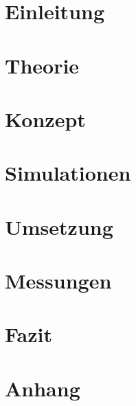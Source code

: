 \documentclass[11pt,a4paper,hidelinks]{article}
\begin{document}










\section{Einleitung}

\pagebreak

\section{Theorie}\label{sec:theory}

\pagebreak

\section{Konzept}\label{sec:concept}

\pagebreak

\section{Simulationen}\label{sec:simulations}

\pagebreak

\section{Umsetzung}\label{sec:realisation}

\pagebreak

\section{Messungen}\label{sec:measurements}

\pagebreak

\section{Fazit}\label{sec:conclusion}

\pagebreak

\section{Anhang}




\end{document}
